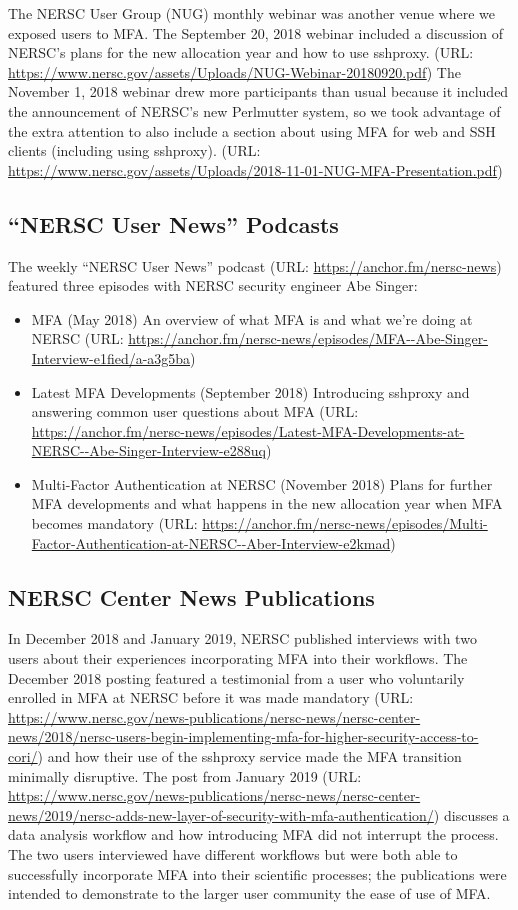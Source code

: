 \documentclass[sigconf,review]{acmart}
\begin{document}
The NERSC User Group (NUG) monthly webinar was another venue where we exposed
users to MFA. The September 20, 2018 webinar included a discussion of NERSC's
plans for the new allocation year and how to use sshproxy. (URL: \url{https://www.nersc.gov/assets/Uploads/NUG-Webinar-20180920.pdf})
The November 1, 2018 webinar drew more participants than usual because it
included the announcement of NERSC's new Perlmutter system, so we took
advantage of the extra attention to also include a section about using MFA for
web and SSH clients (including using sshproxy). (URL: \url{https://www.nersc.gov/assets/Uploads/2018-11-01-NUG-MFA-Presentation.pdf})

\subsection{``NERSC User News'' Podcasts}
\label{podcast}

The weekly ``NERSC User News'' podcast 
(URL: \url{https://anchor.fm/nersc-news}) featured three episodes with NERSC
security engineer Abe Singer:
\begin{itemize}
\item  MFA (May 2018) An overview of what MFA is and what we're doing at NERSC (URL: \url{https://anchor.fm/nersc-news/episodes/MFA--Abe-Singer-Interview-e1fied/a-a3g5ba})
\item  Latest MFA Developments (September 2018) Introducing sshproxy and answering common user questions about MFA (URL: \url{https://anchor.fm/nersc-news/episodes/Latest-MFA-Developments-at-NERSC--Abe-Singer-Interview-e288uq})
\item  Multi-Factor Authentication at NERSC (November 2018) Plans for further MFA developments and what happens in the new allocation year when MFA becomes mandatory (URL: \url{https://anchor.fm/nersc-news/episodes/Multi-Factor-Authentication-at-NERSC--Aber-Interview-e2kmad})
\end{itemize}

\subsection{NERSC Center News Publications}
\label{pubs}

In December 2018 and January 2019, NERSC published interviews with two users
about their experiences incorporating MFA into their workflows. The December
2018 posting featured a testimonial from a user who voluntarily enrolled in MFA
at NERSC before it was made mandatory
(URL: \url{https://www.nersc.gov/news-publications/nersc-news/nersc-center-news/2018/nersc-users-begin-implementing-mfa-for-higher-security-access-to-cori/})
and how their use of the sshproxy service made the MFA transition minimally
disruptive. The post from January 2019
(URL: \url{https://www.nersc.gov/news-publications/nersc-news/nersc-center-news/2019/nersc-adds-new-layer-of-security-with-mfa-authentication/})
discusses a data analysis workflow and how introducing MFA did not interrupt
the process. The two users interviewed have different workflows but were both
able to successfully incorporate MFA into their scientific processes; the
publications were intended to demonstrate to the larger user community the
ease of use of MFA.
\end{document}
